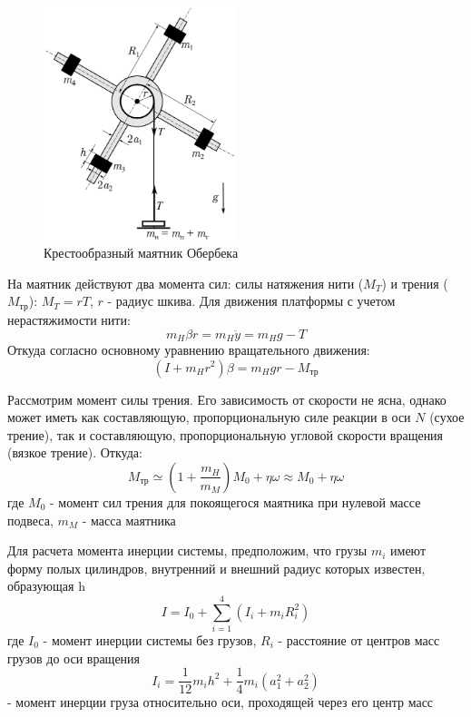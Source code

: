 \documentclass[a4paper,12pt]{article} %
\begin{document}
\begin{figure}[h!]
\begin{center}
\includegraphics[width=0.5\textwidth]{Маятник}
\end{center}
\caption{Крестообразный маятник Обербека} \label{маятник}
\end{figure}
На маятник действуют два момента сил: силы натяжения нити ($M_T$) и трения ($M_\text{тр}$): $M_T = rT$, $r$ - радиус шкива. Для движения платформы с учетом нерастяжимости нити:
\[m_H \beta r = m_H\ddot{y} = m_Hg - T\]
Откуда согласно основному уравнению вращательного движения:
\begin{equation}
(I+m_Hr^2)\beta = m_Hgr-M_\text{тр}
\label{M_T}
\end{equation}

Рассмотрим момент силы трения. Его зависимость от скорости не ясна, однако может иметь как составляющую, пропорциональную силе реакции в оси $N$ (сухое трение), так и составляющую, пропорциональную угловой скорости вращения (вязкое трение). Откуда:
\begin{equation}
M_\text{тр} \simeq (1 + \frac{m_H}{m_M}) M_0 + \eta \omega \approx M_0 +\eta \omega
\label{трение}
\end{equation} 
где $M_0$ - момент сил трения для покоящегося маятника при нулевой массе подвеса, $m_M$ - масса маятника 

Для расчета момента инерции системы, предположим, что грузы $m_i$ имеют форму полых цилиндров, внутренний и внешний радиус которых известен, образующая h
\begin{equation}
I = I_0 + \sum_{i=1}^4(I_i+m_iR_i^2)
\label{I}
\end{equation}
где $I_0$ - момент инерции системы без грузов, $R_i$ -  расстояние от центров масс грузов до оси вращения
\begin{equation}
I_i = \frac{1}{12}m_ih^2+\frac{1}{4}m_i(a_1^2+a_2^2)
\label{Ii}
\end{equation} - момент инерции груза относительно оси, проходящей через его центр масс
\end{document}
